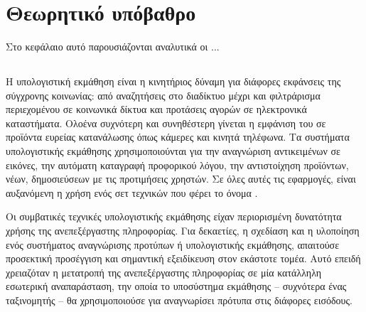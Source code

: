 \chapter{Θεωρητικό υπόβαθρο}

Στο κεφάλαιο αυτό παρουσιάζονται αναλυτικά οι ...

\section{}

Η υπολογιστική εκμάθηση  είναι η κινητήριος δύναμη για διάφορες εκφάνσεις της σύγχρονης κοινωνίας: από αναζητήσεις στο διαδίκτυο μέχρι και φιλτράρισμα περιεχομένου σε κοινωνικά δίκτυα και προτάσεις αγορών σε ηλεκτρονικά καταστήματα. Ολοένα συχνότερη και συνηθέστερη γίνεται η εμφάνιση του σε προϊόντα ευρείας κατανάλωσης όπως κάμερες και κινητά τηλέφωνα. Τα συστήματα υπολογιστικής εκμάθησης χρησιμοποιούνται για την αναγνώριση αντικειμένων σε εικόνες, την αυτόματη καταγραφή προφορικού λόγου, την αντιστοίχηση προϊόντων, νέων, δημοσιεύσεων με τις προτιμήσεις χρηστών. Σε όλες αυτές τις εφαρμογές, είναι αυξανόμενη η χρήση ενός σετ τεχνικών που φέρει το όνομα .

Οι συμβατικές τεχνικές υπολογιστικής εκμάθησης είχαν περιορισμένη δυνατότητα χρήσης της ανεπεξέργαστης πληροφορίας. Για δεκαετίες, η σχεδίαση και η υλοποίηση ενός συστήματος αναγνώρισης προτύπων ή υπολογιστικής εκμάθησης, απαιτούσε προσεκτική προσέγγιση και σημαντική εξειδίκευση στον εκάστοτε τομέα. Αυτό επειδή χρειαζόταν η μετατροπή της ανεπεξέργαστης πληροφορίας σε μία κατάλληλη εσωτερική αναπαράσταση, την οποία το υποσύστημα εκμάθησης -- συχνότερα ένας ταξινομητής -- θα χρησιμοποιούσε για αναγνωρίσει πρότυπα στις διάφορες εισόδους.

